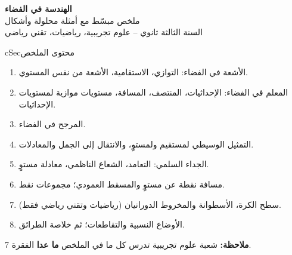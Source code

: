 \documentclass[12pt,a4paper]{article}
\newenvironment{BOX}[2]{\begin{otherlanguage}{english}\begin{arbox}{#1}{#2}}{\end{arbox}\end{otherlanguage}}
\newenvironment{LTR}{\begin{otherlanguage}{english}}{\end{otherlanguage}}
\newcommand{\MT}{\textcolor{cThm}{\small(رياضيات وتقني رياضي فقط)}}
\begin{document}
\begin{LTR}
\begin{tcolorbox}[enhanced,colback=cSec,colframe=cSec,arc=3mm,halign=center,boxrule=0pt,top=12pt,bottom=12pt,before upper={\selectlanguage{arabic}}]
{\color{white}\fontsize{25}{32}\selectfont\bfseries الهندسة في الفضاء}\\[8pt]
{\color{white}\large ملخص مبسّط مع أمثلة محلولة وأشكال}\\[5pt]
{\color{white}\large السنة الثالثة ثانوي -- علوم تجريبية، رياضيات، تقني رياضي}
\end{tcolorbox}
\end{LTR}

\begin{BOX}{cSec}{محتوى الملخص}
\begin{enumerate}[label=\textbf{\arabic*.}]
\item الأشعة في الفضاء: التوازي، الاستقامية، الأشعة من نفس المستوي.
\item المعلم في الفضاء: الإحداثيات، المنتصف، المسافة، مستويات موازية لمستويات الإحداثيات.
\item المرجح في الفضاء.
\item التمثيل الوسيطي لمستقيم ولمستوٍ، والانتقال إلى الجمل والمعادلات.
\item الجداء السلمي: التعامد، الشعاع الناظمي، معادلة مستوٍ.
\item مسافة نقطة عن مستوٍ والمسقط العمودي؛ مجموعات نقط.
\item سطح الكرة، الأسطوانة والمخروط الدورانيان \MT.
\item الأوضاع النسبية والتقاطعات؛ ثم خلاصة الطرائق.
\end{enumerate}
\textbf{ملاحظة:} شعبة علوم تجريبية تدرس كل ما في الملخص \textbf{ما عدا} الفقرة 7.
\end{BOX}
\end{document}
